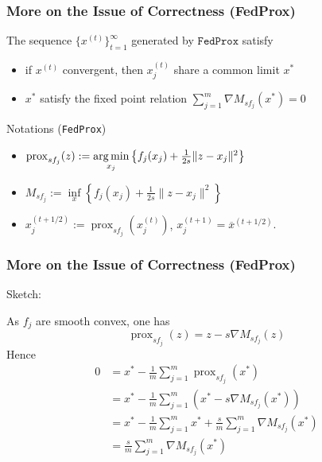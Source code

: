 \begin{frame}
\frametitle{More on the Issue of Correctness (FedProx)}

\begin{prop}
The sequence $\{x^{(t)}\}_{t=1}^{\infty}$ generated by $\texttt{FedProx}$ satisfy
\begin{itemize}
    \item if $x^{(t)}$ convergent, then $x_j^{(t)}$ share a common limit $x^*$
    \vspace{-0.3em}
    \item $x^*$ satisfy the fixed point relation {$\sum\limits_{j=1}^m \nabla M_{sf_j}(x^*) = 0$}
\end{itemize}
\end{prop}

\begin{block}{Notations (\texttt{FedProx})}
\begin{itemize}
\item $\operatorname{prox}_{sf_j} (z) := \operatorname*{arg\,min}\limits_{x_j} \left\{ f_j(x_j) + \frac{1}{2s} \lVert z-x_j \rVert^2 \right\}$
\vspace{-0.3em}
\item $M_{sf_j} := \inf\limits_x \left\{ f_j(x_j) + \frac{1}{2s} \lVert z-x_j \rVert^2 \right\}$
\vspace{-0.3em}
\item $x_j^{(t+1/2)} := \operatorname{prox}_{sf_j}(x_j^{(t)})$, $x_j^{(t+1)} = \overline{x}^{(t+1/2)}.$
\end{itemize}
\end{block}

\end{frame}


\begin{frame}
\frametitle{More on the Issue of Correctness (FedProx)}

Sketch:

As $f_j$ are smooth convex, one has
$$\operatorname{prox}_{sf_j}(z) = z - s\nabla M_{sf_j}(z)$$
Hence
{\smaller
\begin{align*}
0 & = x^* - \frac{1}{m}\sum_{j=1}^m \operatorname{prox}_{sf_j}(x^*) \\
& = x^* - \frac{1}{m}\sum_{j=1}^m \left( x^* - s\nabla M_{sf_j}(x^*) \right) \\
& = x^* - \frac{1}{m}\sum_{j=1}^m x^* + \frac{s}{m}\sum_{j=1}^m\nabla M_{sf_j}(x^*) \\
& = \frac{s}{m}\sum_{j=1}^m\nabla M_{sf_j}(x^*)
\end{align*}
}

\end{frame}


